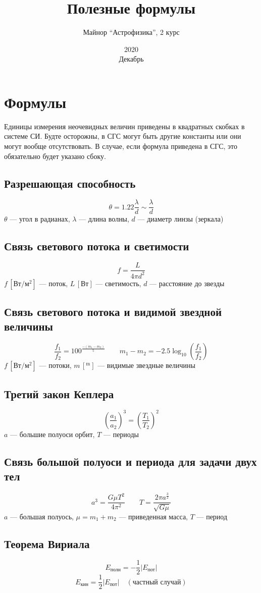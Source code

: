 \documentclass[12pt]{article}
\title{\textbf{Полезные формулы}}
\date{2020\\ Декабрь}
\author{Майнор ``Астрофизика'', 2 курс}
\begin{document}
\maketitle
\section{Формулы}
Единицы измерения неочевидных величин приведены в квадратных скобках в системе СИ. Будте осторожны, в СГС могут быть другие константы или они могут вообще отсутствовать. В случае, если формула приведена в СГС, это обязательно будет указано сбоку.
\subsection{Разрешающая способность}
\[\theta=1.22\frac\lambda d\sim\frac\lambda d\]
$\theta$ --- угол в радианах, $\lambda$ --- длина волны, $d$ --- диаметр линзы (зеркала)
\subsection{Связь светового потока и светимости}
\[f=\frac{L}{4\pi d^2}\]
$f\,[\text{Вт}/\text{м}^2]$ --- поток, $L\,[\text{Вт}]$ --- светимость, $d$ --- расстояние до звезды
\subsection{Связь светового потока и видимой звездной величины}
\[\frac{f_1}{f_2}=100^{\frac{-(m_1-m_2)}{5}}\quad\quad m_1-m_2=-2.5\log_{10}\left(\frac{f_1}{f_2}\right)\]
$f\,[\text{Вт}/\text{м}^2]$ --- потоки, $m\,[^\text{m}]$ --- видимые звездные величины
\subsection{Третий закон Кеплера}
\[\left(\frac{a_1}{a_2}\right)^3=\left(\frac{T_1}{T_2}\right)^2\]
$a$ --- большие полуоси орбит, $T$ --- периоды
\subsection{Связь большой полуоси и периода для задачи двух тел}
\[a^3=\frac{G\mu T^2}{4\pi^2}\quad\quad T=\frac{2\pi a^{\frac32}}{\sqrt{G\mu}}\]
$a$ --- большая полуось, $\mu=m_1+m_2$ --- приведенная масса, $T$ --- период
\subsection{Теорема Вириала}
\[E_\text{полн}=-\frac12|E_\text{пот}|\]
\[E_\text{кин}=\frac12|E_\text{пот}|\quad(\text{частный случай})\]
\end{document}
